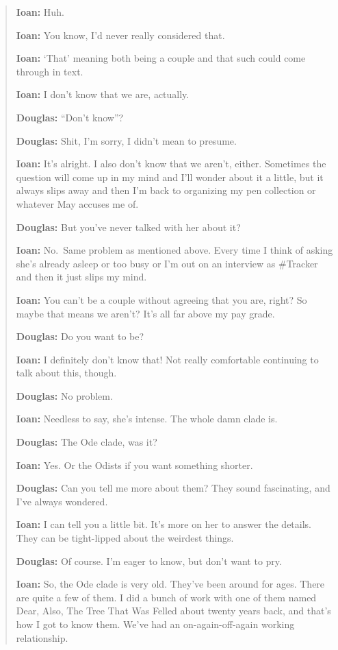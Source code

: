 \begin{quote}
\textbf{Ioan:} Huh.

\textbf{Ioan:} You know, I'd never really considered that.

\textbf{Ioan:} `That' meaning both being a couple and that such could come through in text.

\textbf{Ioan:} I don't know that we are, actually.

\textbf{Douglas:} ``Don't know''?

\textbf{Douglas:} Shit, I'm sorry, I didn't mean to presume.

\textbf{Ioan:} It's alright. I also don't know that we aren't, either. Sometimes the question will come up in my mind and I'll wonder about it a little, but it always slips away and then I'm back to organizing my pen collection or whatever May accuses me of.

\textbf{Douglas:} But you've never talked with her about it?

\textbf{Ioan:} No.~Same problem as mentioned above. Every time I think of asking she's already asleep or too busy or I'm out on an interview as \#Tracker and then it just slips my mind.

\textbf{Ioan:} You can't be a couple without agreeing that you are, right? So maybe that means we aren't? It's all far above my pay grade.

\textbf{Douglas:} Do you want to be?

\textbf{Ioan:} I definitely don't know that! Not really comfortable continuing to talk about this, though.

\textbf{Douglas:} No problem.

\textbf{Ioan:} Needless to say, she's intense. The whole damn clade is.

\textbf{Douglas:} The Ode clade, was it?

\textbf{Ioan:} Yes. Or the Odists if you want something shorter.

\textbf{Douglas:} Can you tell me more about them? They sound fascinating, and I've always wondered.

\textbf{Ioan:} I can tell you a little bit. It's more on her to answer the details. They can be tight-lipped about the weirdest things.

\textbf{Douglas:} Of course. I'm eager to know, but don't want to pry.

\textbf{Ioan:} So, the Ode clade is very old. They've been around for ages. There are quite a few of them. I did a bunch of work with one of them named Dear, Also, The Tree That Was Felled about twenty years back, and that's how I got to know them. We've had an on-again-off-again working relationship.


\end{quote}
